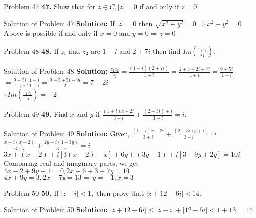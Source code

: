 \documentclass[aspectratio=169,8pt]{beamer}
\begin{document}
\begin{frame}{Problem 47}
  \textbf{47.} Show that for $z\in C, |z| = 0$ if and only if $z = 0.$
\end{frame}
\begin{frame}{Solution of Problem 47}
  \textbf{Solution:} If $|z| = 0$ then $\sqrt{x^2 + y^2} = 0 \Rightarrow x^2 + y^2 = 0$\\
  \vspace*{0.2cm}
  Above is possible if and only if $x = 0$ and $y = 0 \Rightarrow z = 0$
\end{frame}
\begin{frame}{Problem 48}
  \textbf{48.} If $z_1$ and $z_2$ are $1 - i$ and $2 + 7i$ then find $Im\left(\frac{z_1z_2}{\overline{z_1}}\right).$
\end{frame}
\begin{frame}{Solution of Problem 48}
  \textbf{Solution:} $\frac{z_1z_2}{\overline{z_1}} = \frac{(1 - i)(2 + 7i)}{1 + i} = \frac{2 + 7 -2i + 7i}{1 + i} = \frac{9 + 5i}{1 + i}$\\
  \vspace*{0.2cm}
  $= \frac{9 + 5i}{1 + i}.\frac{1 - i}{1 - i} = \frac{9 + 5 + 5i -9i}{2} = 7 - 2i$\\
  \vspace*{0.2cm}
  $\therefore Im\left(\frac{z_1z_2}{\overline{z_1}}\right) = -2$
\end{frame}
\begin{frame}{Problem 49}
  \textbf{49.} Find $x$ and $y$ if $\frac{(1 + i)x - 2i}{3 + i} + \frac{(2 - 3i)+ i}{3 - i} = i.$
\end{frame}
\begin{frame}{Solution of Problem 49}
  \textbf{Solution:} Given, $\frac{(1 + i)x - 2i}{3 + i} + \frac{(2 - 3i)y+ i}{3 - i} = i$\\
  \vspace*{0.2cm}
  $\frac{x + i(x - 2)}{3 + i} + \frac{2y + i(1 - 3y)}{3 - i} = i$\\
  \vspace*{0.2cm}
  $3x + (x - 2) + i[3(x - 2)- x] + 6y +(3y - 1) + i[3 - 9y + 2y] = 10i$\\
  \vspace*{0.2cm}
  Comparing real and imaginary parts, we get
  $4x - 2 + 9y - 1 = 0, 2x - 6 + 3 - 7y = 10$\\
  \vspace*{0.2cm}
  $4x + 9y = 3, 2x - 7y = 13 \Rightarrow y = -1, x = 3$
\end{frame}
\begin{frame}{Problem 50}
  \textbf{50.} If $|z - i| < 1,$ then prove that $|z + 12 - 6i| < 14.$
\end{frame}
\begin{frame}{Solution of Problem 50}
  \textbf{Solution:} $|z + 12 - 6i| \leq |z - i| + |12 - 5i| < 1 + 13 = 14$
\end{frame}
\end{document}
